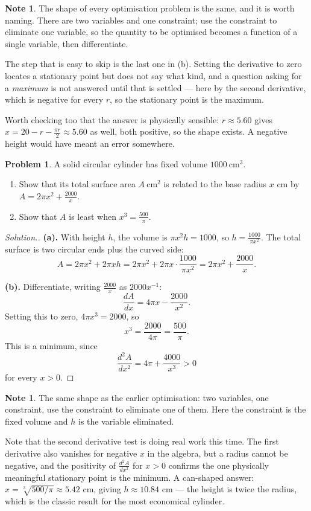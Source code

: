 \documentclass[11pt,a4paper]{article}
\theoremstyle{definition}
\newtheorem{note}[thm]{Note}
\newtheorem{problemx}{Problem}[section]
\newenvironment{problem}{\begin{problemx}}{\end{problemx}}
\newenvironment{solution}
  {\renewcommand{\qedsymbol}{}\begin{proof}[\textit{Solution}.]}
  {\end{proof}}
\begin{document}
\begin{note}
The shape of every optimisation problem is the same, and it is worth naming. There
are two variables and one constraint; use the constraint to eliminate one variable,
so the quantity to be optimised becomes a function of a single variable, then
differentiate.

The step that is easy to skip is the last one in (b). Setting the derivative to
zero locates a stationary point but does not say what kind, and a question asking
for a \emph{maximum} is not answered until that is settled --- here by the second
derivative, which is negative for every $r$, so the stationary point is the
maximum.

Worth checking too that the answer is physically sensible: $r\approx 5.60$ gives
$x=20-r-\frac{\pi r}{2}\approx 5.60$ as well, both positive, so the shape exists.
A negative height would have meant an error somewhere.
\end{note}

\pagebreak

\begin{problem}
A solid circular cylinder has fixed volume $1000\ \text{cm}^{3}$.
\begin{enumerate}
\item[(a).] Show that its total surface area $A\ \text{cm}^{2}$ is related to the
base radius $x$ cm by $A=2\pi x^{2}+\frac{2000}{x}$.
\item[(b).] Show that $A$ is least when $x^{3}=\frac{500}{\pi}$.
\end{enumerate}
\end{problem}

\begin{solution}
\textbf{(a).} With height $h$, the volume is $\pi x^{2}h=1000$, so
$h=\frac{1000}{\pi x^{2}}$. The total surface is two circular ends plus the
curved side:
$$A=2\pi x^{2}+2\pi x h=2\pi x^{2}+2\pi x\cdot\frac{1000}{\pi x^{2}}
=2\pi x^{2}+\frac{2000}{x}.$$

\textbf{(b).} Differentiate, writing $\frac{2000}{x}$ as $2000x^{-1}$:
$$\frac{dA}{dx}=4\pi x-\frac{2000}{x^{2}} .$$
Setting this to zero, $4\pi x^{3}=2000$, so
$$x^{3}=\frac{2000}{4\pi}=\frac{500}{\pi}.$$
This is a minimum, since
$$\frac{d^{2}A}{dx^{2}}=4\pi+\frac{4000}{x^{3}}>0$$
for every $x>0$.
\end{solution}

\begin{note}
The same shape as the earlier optimisation: two variables, one constraint, use the
constraint to eliminate one of them. Here the constraint is the fixed volume and
$h$ is the variable eliminated.

Note that the second derivative test is doing real work this time. The first
derivative also vanishes for negative $x$ in the algebra, but a radius cannot be
negative, and the positivity of $\frac{d^{2}A}{dx^{2}}$ for $x>0$ confirms the one
physically meaningful stationary point is the minimum. A can-shaped answer:
$x=\sqrt[3]{500/\pi}\approx 5.42$ cm, giving $h\approx 10.84$ cm --- the height is
twice the radius, which is the classic result for the most economical cylinder.
\end{note}
\end{document}
